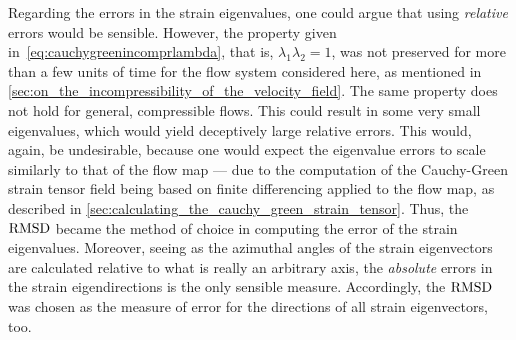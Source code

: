 %
Regarding the errors in the strain eigenvalues, one could argue that using
\emph{relative} errors would be sensible. However, the property
given in~\cref{eq:cauchygreenincomprlambda}, that is,
$\lambda_{1}\lambda_{2}=1$, was not preserved for more than a few units of
time for the flow system considered here, as mentioned in
\cref{sec:on_the_incompressibility_of_the_velocity_field}. The same property
does not hold for general, compressible flows. This could result in
some very small eigenvalues, which would yield deceptively large relative
errors. This would, again, be undesirable, because one would expect the
eigenvalue errors to scale similarly to that of the flow map --- due to the
computation of the Cauchy-Green strain tensor field being based on finite
differencing applied to the flow map, as described in
\cref{sec:calculating_the_cauchy_green_strain_tensor}. Thus, the $\operatorname{RMSD}$
became the method of choice in computing the error of the strain eigenvalues.
Moreover, seeing as the azimuthal angles of the strain eigenvectors are
calculated relative to what is really an arbitrary axis, the \emph{absolute}
errors in the strain eigendirections is the only sensible measure. Accordingly,
the $\operatorname{RMSD}$ was chosen as the measure of error for the directions of all strain
eigenvectors, too.
%

